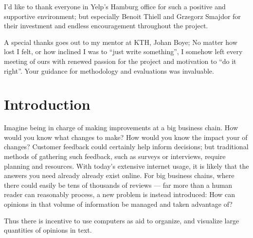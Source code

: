 \documentclass[a4paper,11pt]{kth-mag}
\begin{document}
I'd like to thank everyone in Yelp's Hamburg office for such a positive and supportive environment; but especially
Benoit Thiell and Grzegorz Smajdor for their investment and endless encouragement throughout the project.

A special thanks goes out to my mentor at KTH, Johan Boye; No matter how lost I felt, or how inclined I was to
``just write something'', I somehow left every meeting of ours with renewed passion for the project and motivation to
``do it right''. Your guidance for methodology and evaluations was invaluable.


\clearpage

\tableofcontents*


\mainmatter
\pagestyle{newchap}
\chapter{Introduction}
Imagine being in charge of making improvements at a big business chain.
How would you know what changes to make? How would you know the impact your of changes?
Customer feedback could certainly help inform decisions; but traditional methods of gathering such feedback,
such as surveys or interviews, require planning and resources.
With today's extensive internet usage, it is likely that the answers you need already
already exist online. For big business chains, where there could easily be tens of thousands of reviews ---
far more than a human reader can reasonably process, a new problem is instead introduced: How can opinions in that
volume of information be managed and taken advantage of?

Thus there is incentive to use computers as aid to organize, and visualize large quantities of opinions in text.
\end{document}
